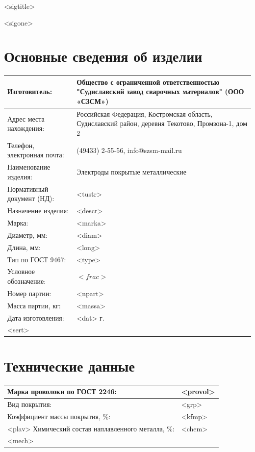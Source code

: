 \documentclass[russian,utf8,pointsection,nocolumnxxxi,nocolumnxxxii,12pt]{eskdtext}
\begin{document}
<sigtitle>
\maketitle
<sigone>
\tableofcontents
\pagebreak[4]

\section{ Основные сведения об изделии }

\begin{longtable}{|p{5cm}|p{10cm}|}
\hline 
Изготовитель: & Общество с ограниченной ответственностью "Судиславский завод сварочных материалов" (ООО «СЗСМ»)  \\
\hline 
Адрес места нахождения: & Российская Федерация, Костромская область, Судиславский район, деревня Текотово, Промзона-1, дом 2  \\
\hline 
Телефон, электронная почта: & (49433) 2-55-56, info@szsm-mail.ru \\
\hline 
Наименование изделия: & Электроды покрытые металлические \\
\hline 
Нормативный документ (НД): & <tustr> \\
\hline 
Назначение изделия:  & <descr> \\
\hline 
Марка: & <marka> \\
\hline 
Диаметр, мм: & <diam> \\
\hline 
Длина, мм: & <long> \\
\hline 
Тип по ГОСТ 9467: & <type> \\
\hline 
Условное обозначение: & \vspace{-2.5mm}  $ <frac> $ \vspace{2.5mm}\\
\hline 
Номер партии: & <npart> \\
\hline 
Масса партии, кг: & <massa> \\
\hline 
Дата изготовления: & <dat> г. \\
\hline 
<sert>
\end{longtable}

\section{Технические данные}

\begin{longtable}{|p{5cm}|p{10cm}|}
\hline 
Марка проволоки по ГОСТ 2246: & <provol>  \\
\hline 
Вид покрытия: & <grp>  \\
\hline 
Коэффициент массы покрытия, \%: & <kfmp> \\
\hline 
<plav>
Химический состав наплавленного металла, \%: &  
\vspace{-2.5mm} 
<chem>
\vspace{2.5mm} 
\\
\hline 
<mech>
\end{longtable}
\end{document}

